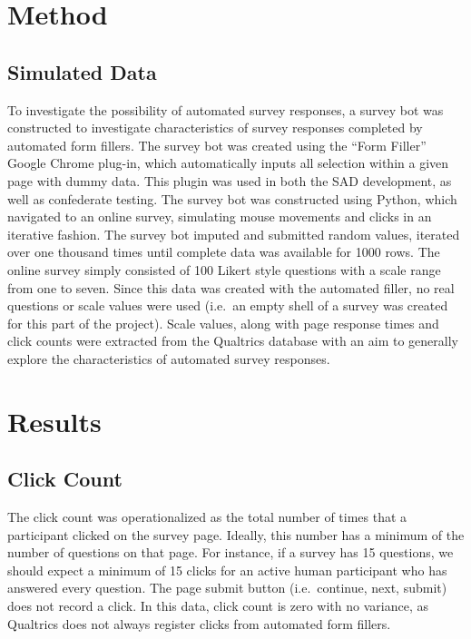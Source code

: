 \documentclass[english,man]{apa6}
\theoremstyle{definition}
\theoremstyle{definition}
\theoremstyle{definition}
\theoremstyle{remark}
\begin{document}
\section{Method}\label{method}

\subsection{Simulated Data}\label{simulated-data}

To investigate the possibility of automated survey responses, a survey
bot was constructed to investigate characteristics of survey responses
completed by automated form fillers. The survey bot was created using
the \enquote{Form Filler} Google Chrome plug-in, which automatically
inputs all selection within a given page with dummy data. This plugin
was used in both the SAD development, as well as confederate testing.
The survey bot was constructed using Python, which navigated to an
online survey, simulating mouse movements and clicks in an iterative
fashion. The survey bot imputed and submitted random values, iterated
over one thousand times until complete data was available for 1000 rows.
The online survey simply consisted of 100 Likert style questions with a
scale range from one to seven. Since this data was created with the
automated filler, no real questions or scale values were used (i.e.~an
empty shell of a survey was created for this part of the project). Scale
values, along with page response times and click counts were extracted
from the Qualtrics database with an aim to generally explore the
characteristics of automated survey responses.

\section{Results}\label{results}

\subsection{Click Count}\label{click-count}

The click count was operationalized as the total number of times that a
participant clicked on the survey page. Ideally, this number has a
minimum of the number of questions on that page. For instance, if a
survey has 15 questions, we should expect a minimum of 15 clicks for an
active human participant who has answered every question. The page
submit button (i.e.~continue, next, submit) does not record a click. In
this data, click count is zero with no variance, as Qualtrics does not
always register clicks from automated form fillers.
\end{document}
